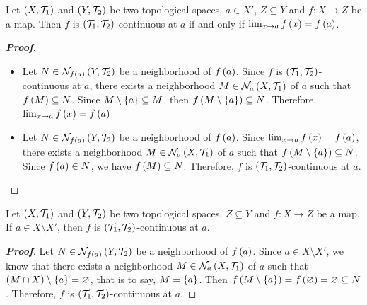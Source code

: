 \begin{proposition}
  Let $\left(X,\mathcal{T}_1\right)$ and $\left(Y,\mathcal{T}_2\right)$ be two topological spaces, $a\in X'$, $Z\subseteq Y$ and $f:X\rightarrow Z$ be a map. Then $f$ is $\left(\mathcal{T}_1,\mathcal{T}_2\right)$-continuous at $a$ if and only if $\lim_{x\to a}{f\left(x\right)}=f\left(a\right)$.

  \begin{proof}[\rm\textbf{Proof}]
    \hfill
    \begin{itemize}
      \item[\boxed{\Rightarrow}] Let $N\in\mathcal{N}_{f\left(a\right)}\left(Y,\mathcal{T}_2\right)$ be a neighborhood of $f\left(a\right)$. Since $f$ is $\left(\mathcal{T}_1,\mathcal{T}_2\right)$-continuous at $a$, there exists a neighborhood $M\in\mathcal{N}_a\left(X,\mathcal{T}_1\right)$ of $a$ such that $f\left(M\right)\subseteq N$. Since $M\setminus\left\{a\right\}\subseteq M$, then $f\left(M\setminus\left\{a\right\}\right)\subseteq N$. Therefore, $\lim_{x\to a}{f\left(x\right)}=f\left(a\right)$.
      \item[\boxed{\Leftarrow}] Let $N\in\mathcal{N}_{f\left(a\right)}\left(Y,\mathcal{T}_2\right)$ be a neighborhood of $f\left(a\right)$. Since $\lim_{x\to a}{f\left(x\right)}=f\left(a\right)$, there exists a neighborhood $M\in\mathcal{N}_a\left(X,\mathcal{T}_1\right)$ of $a$ such that $f\left(M\setminus\left\{a\right\}\right)\subseteq N$. Since $f\left(a\right)\in N$, we have $f\left(M\right)\subseteq N$. Therefore, $f$ is $\left(\mathcal{T}_1,\mathcal{T}_2\right)$-continuous at $a$.
    \end{itemize}
  \end{proof}
\end{proposition}

\begin{proposition}
  Let $\left(X,\mathcal{T}_1\right)$ and $\left(Y,\mathcal{T}_2\right)$ be two topological spaces, $Z\subseteq Y$ and $f:X\rightarrow Z$ be a map. If $a\in X\setminus X'$, then $f$ is $\left(\mathcal{T}_1,\mathcal{T}_2\right)$-continuous at $a$.
  
  \begin{proof}[\rm\textbf{Proof}]
    Let $N\in\mathcal{N}_{f\left(a\right)}\left(Y,\mathcal{T}_2\right)$ be a neighborhood of $f\left(a\right)$. Since $a\in X\setminus X'$, we know that there exists a neighborhood $M\in\mathcal{N}_a\left(X,\mathcal{T}_1\right)$ of $a$ such that $\left(M\cap X\right)\setminus\left\{a\right\}=\varnothing$, that is to say, $M=\left\{a\right\}$. Then $f\left(M\setminus\left\{a\right\}\right)=f\left(\varnothing\right)=\varnothing\subseteq N$. Therefore, $f$ is $\left(\mathcal{T}_1,\mathcal{T}_2\right)$-continuous at $a$.
  \end{proof}
\end{proposition}

